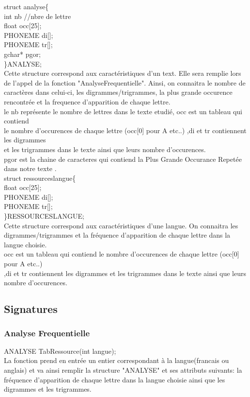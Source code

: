 \documentclass[a4]{article}
\begin{document}
	struct analyse\{ \\
		int nb //nbre de lettre \\
		float occ[25];\\
		PHONEME di[];\\
		PHONEME tr[];\\
		gchar* pgor;\\
	\}ANALYSE;\\
	Cette structure correspond aux caractéristiques d'un text. Elle sera remplie lors de
	l'appel de la fonction "AnalyseFrequentielle". Ainsi, on connaitra
	le nombre de caractères dans celui-ci, les digrammes/trigrammes, la plus grande occurence
	rencontrée et la frequence d'apparition de chaque lettre.\\
	le nb représente le nombre de lettres dans le texte etudié, occ est un tableau qui contiend \\
	le nombre d'occurences de chaque lettre (occ[0] pour A etc..) ,di et tr contiennent les digrammes \\
	et les trigrammes dans le texte ainsi que leurs nombre d'occurences.\\
	pgor est la chaine de caracteres qui contiend la Plus Grande Occurance Repetée dans notre texte .\\
	
	
	struct ressourceslangue\{ \\
		float occ[25];\\
		PHONEME di[];\\
		PHONEME tr[];\\
	\}RESSOURCESLANGUE;\\
	Cette structure correspond aux caractéristiques d'une langue. On connaitra
	les digrammes/trigrammes et la fréquence d'apparition de chaque lettre dans la langue choisie.\\
	occ est un tableau qui contiend le nombre d'occurences de chaque lettre (occ[0] pour A etc..) \\
	,di et tr contiennent les digrammes et les trigrammes dans le texte ainsi que leurs nombre d'occurences.
		\subsection{Signatures}
		
	
	\subsubsection{Analyse Frequentielle}
	ANALYSE TabRessource(int langue);\\
		La fonction prend en entrée un entier correspondant à la langue(francais ou anglais)
		et va ainsi remplir la structure "ANALYSE" et ses attributs suivants:
		la fréquence d'apparition de chaque lettre dans la langue choisie ainsi que les digrammes
		et les trigrammes.\\
		
\end{document}
